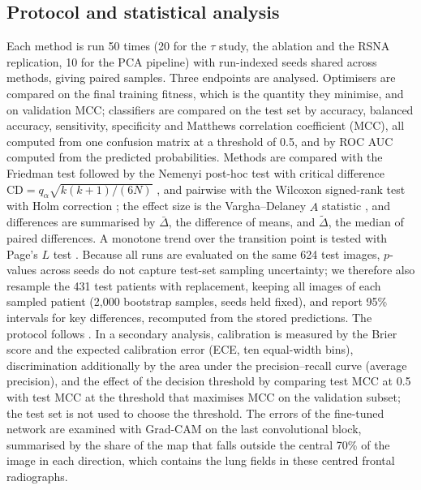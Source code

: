 \documentclass[10pt,letterpaper]{article}
\begin{document}
\subsection{Protocol and statistical analysis}\label{sec:protocol}
Each method is run 50 times (20 for the $\tau$ study, the ablation and the RSNA replication, 10 for the PCA pipeline) with run-indexed seeds shared across methods, giving paired samples. Three endpoints are analysed. Optimisers are compared on the final training fitness, which is the quantity they minimise, and on validation MCC; classifiers are compared on the test set by accuracy, balanced accuracy, sensitivity, specificity and Matthews correlation coefficient (MCC), all computed from one confusion matrix at a threshold of 0.5, and by ROC AUC computed from the predicted probabilities. Methods are compared with the Friedman test \citep{friedman1937} followed by the Nemenyi post-hoc test with critical difference $\mathrm{CD}=q_{\alpha}\sqrt{k(k+1)/(6N)}$ \citep{demsar2006}, and pairwise with the Wilcoxon signed-rank test \citep{wilcoxon1945} with Holm correction \citep{holm1979}; the effect size is the Vargha--Delaney $\hat A$ statistic \citep{vargha2000}, and differences are summarised by $\bar\Delta$, the difference of means, and $\tilde\Delta$, the median of paired differences. A monotone trend over the transition point is tested with Page's $L$ test \citep{page1963trend}. Because all runs are evaluated on the same 624 test images, $p$-values across seeds do not capture test-set sampling uncertainty; we therefore also resample the 431 test patients with replacement, keeping all images of each sampled patient (2,000 bootstrap samples, seeds held fixed), and report 95\% intervals for key differences, recomputed from the stored predictions. The protocol follows \citet{derrac2011tutorial}. In a secondary analysis, calibration is measured by the Brier score and the expected calibration error (ECE, ten equal-width bins), discrimination additionally by the area under the precision--recall curve (average precision), and the effect of the decision threshold by comparing test MCC at 0.5 with test MCC at the threshold that maximises MCC on the validation subset; the test set is not used to choose the threshold. The errors of the fine-tuned network are examined with Grad-CAM \citep{selvaraju2017gradcam} on the last convolutional block, summarised by the share of the map that falls outside the central 70\% of the image in each direction, which contains the lung fields in these centred frontal radiographs.
\end{document}
